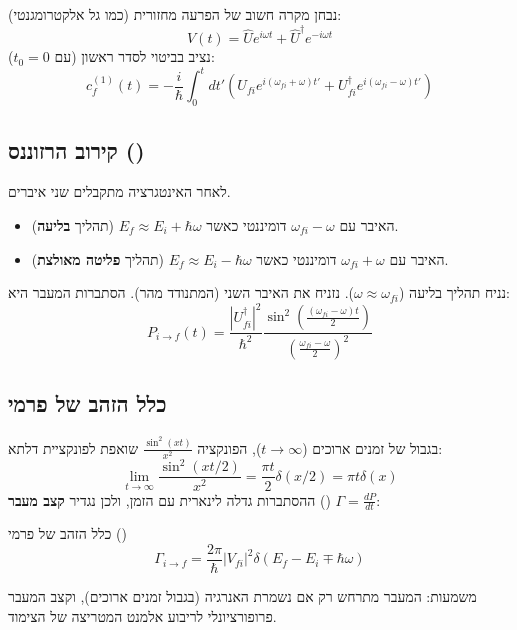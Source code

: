 נבחן מקרה חשוב של הפרעה מחזורית (כמו גל אלקטרומגנטי):
\[ V(t) = \hat{U} e^{i\omega t} + \hat{U}^\dagger e^{-i\omega t} \]
נציב בביטוי לסדר ראשון (עם $t_0=0$):
\[ c_f^{(1)}(t) = -\frac{i}{\hbar} \int_0^t dt' \left( U_{fi} e^{i(\omega_{fi} + \omega)t'} + U^\dagger_{fi} e^{i(\omega_{fi} - \omega)t'} \right) \]

\subsection{\texorpdfstring{קירוב הרזוננס ()}{קירוב הרזוננס (Rotating Wave Approximation)}}
לאחר האינטגרציה מתקבלים שני איברים.
\begin{itemize}
    \item האיבר עם $\omega_{fi} - \omega$ דומיננטי כאשר $E_f \approx E_i + \hbar\omega$ (תהליך \textbf{בליעה}).
    \item האיבר עם $\omega_{fi} + \omega$ דומיננטי כאשר $E_f \approx E_i - \hbar\omega$ (תהליך \textbf{פליטה מאולצת}).
\end{itemize}
נניח תהליך בליעה ($\omega \approx \omega_{fi}$). נזניח את האיבר השני (המתנודד מהר).
הסתברות המעבר היא:
\[ P_{i \to f}(t) = \frac{|U_{fi}^\dagger|^2}{\hbar^2} \frac{\sin^2\left(\frac{(\omega_{fi} - \omega)t}{2}\right)}{\left(\frac{\omega_{fi} - \omega}{2}\right)^2} \]

\subsection{כלל הזהב של פרמי}
בגבול של זמנים ארוכים ($t \to \infty$), הפונקציה $\frac{\sin^2(xt)}{x^2}$ שואפת לפונקציית דלתא:
\[ \lim_{t \to \infty} \frac{\sin^2(xt/2)}{x^2} = \frac{\pi t}{2} \delta(x/2) = \pi t \delta(x) \]
ההסתברות גדלה לינארית עם הזמן, ולכן נגדיר \textbf{קצב מעבר} () $\Gamma = \frac{dP}{dt}$:

\begin{theorembox}{כלל הזהב של פרמי ()}
\[ \Gamma_{i \to f} = \frac{2\pi}{\hbar} |V_{fi}|^2 \delta(E_f - E_i \mp \hbar\omega) \]
\end{theorembox}
משמעות: המעבר מתרחש רק אם נשמרת האנרגיה (בגבול זמנים ארוכים), וקצב המעבר פרופורציונלי לריבוע אלמנט המטריצה של הצימוד.